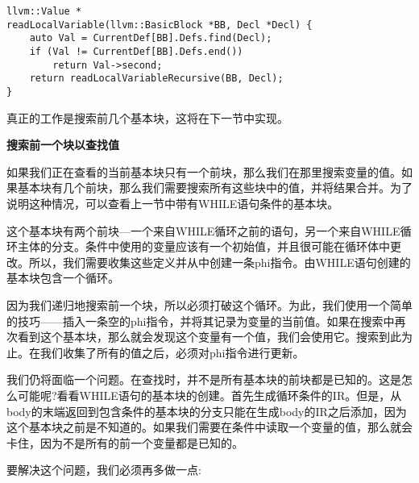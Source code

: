 \begin{lstlisting}[caption={}]
llvm::Value *
readLocalVariable(llvm::BasicBlock *BB, Decl *Decl) {
	auto Val = CurrentDef[BB].Defs.find(Decl);
	if (Val != CurrentDef[BB].Defs.end())
		return Val->second;
	return readLocalVariableRecursive(BB, Decl);
}
\end{lstlisting}

真正的工作是搜索前几个基本块，这将在下一节中实现。\par

\hspace*{\fill} \par %
\textbf{搜索前一个块以查找值}

如果我们正在查看的当前基本块只有一个前块，那么我们在那里搜索变量的值。如果基本块有几个前块，那么我们需要搜索所有这些块中的值，并将结果合并。为了说明这种情况，可以查看上一节中带有WHILE语句条件的基本块。\par

这个基本块有两个前块—一个来自WHILE循环之前的语句，另一个来自WHILE循环主体的分支。条件中使用的变量应该有一个初始值，并且很可能在循环体中更改。所以，我们需要收集这些定义并从中创建一条phi指令。由WHILE语句创建的基本块包含一个循环。\par

因为我们递归地搜索前一个块，所以必须打破这个循环。为此，我们使用一个简单的技巧——插入一条空的phi指令，并将其记录为变量的当前值。如果在搜索中再次看到这个基本块，那么就会发现这个变量有一个值，我们会使用它。搜索到此为止。在我们收集了所有的值之后，必须对phi指令进行更新。\par

我们仍将面临一个问题。在查找时，并不是所有基本块的前块都是已知的。这是怎么可能呢?看看WHILE语句的基本块的创建。首先生成循环条件的IR。但是，从body的末端返回到包含条件的基本块的分支只能在生成body的IR之后添加，因为这个基本块之前是不知道的。如果我们需要在条件中读取一个变量的值，那么就会卡住，因为不是所有的前一个变量都是已知的。\par

要解决这个问题，我们必须再多做一点:\par

